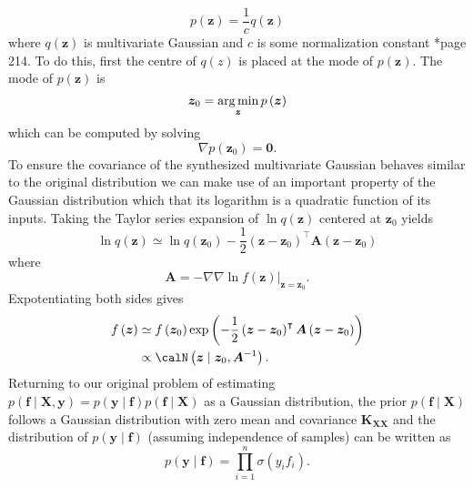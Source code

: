 \begin{equation*}
    p \left( \bm{z} \right) = \frac{1}{c} q \left( \bm{z} \right)
\end{equation*}
where $q \left( \bm{z} \right)$ is multivariate Gaussian and $c$ is some normalization constant \cite{BishopChristopherM2006Pram}*{page 214}. To do this, first the centre of $q \left( z \right)$ is placed at the mode of $p \left( \bm{z} \right)$. The mode of $p \left( \bm{z} \right)$ is
\begin{equation*}
    \bm{z}_0 = \operatorname*{\arg\min}_{\bm{z}} p \left( \bm{z} \right)
\end{equation*}
which can be computed by solving
\begin{equation*}
    \nabla p \left( \bm{z}_0 \right) = \bm{0}.
\end{equation*}
To ensure the covariance of the synthesized multivariate Gaussian behaves similar to the original distribution we can make use of an important property of the Gaussian distribution which that its logarithm is a quadratic function of its inputs. Taking the Taylor series expansion of $\ln q \left( \bm{z} \right)$ centered at $\bm{z}_0$ yields
\begin{equation*}
    \ln q \left( \bm{z} \right) \simeq \ln q \left( \bm{z}_0 \right) - \frac{1}{2} \left( \bm{z} - \bm{z}_0 \right)^{\intercal} \bm{A} \left( \bm{z} - \bm{z}_0 \right)
\end{equation*}
where
\begin{equation*}
    \bm{A} = - \nabla \nabla \left. \ln f \left( \bm{z} \right) \right|_{\bm{z} = \bm{z}_0}.
\end{equation*}
Expotentiating both sides gives
\begin{align*}
    f \left( \bm{z} \right)
     & \simeq f \left( \bm{z}_0 \right) \exp \left( - \frac{1}{2} \left( \bm{z} - \bm{z}_0 \right)^{\intercal} \bm{A} \left( \bm{z} - \bm{z}_0 \right) \right) \\
     & \propto \calN \left( \bm{z} \mid \bm{z}_0 , \bm{A}^{-1} \right).
\end{align*}
Returning to our original problem of estimating $p \left( \bm{f} \mid \bm{X} , \bm{y} \right) = p \left( \bm{y} \mid \bm{f} \right) p \left( \bm{f} \mid \bm{X} \right)$ as a Gaussian distribution, the prior $p \left( \bm{f} \mid \bm{X} \right)$ follows a Gaussian distribution with zero mean and covariance $\bm{K}_{\bm{X} \bm{X}}$ and the distribution of $p \left( \bm{y} \mid \bm{f} \right)$ (assuming independence of samples) can be written as
\begin{equation*}
    p \left( \bm{y} \mid \bm{f} \right) = \prod_{i=1}^{n} \sigma \left( y_i f_i \right).
\end{equation*}
